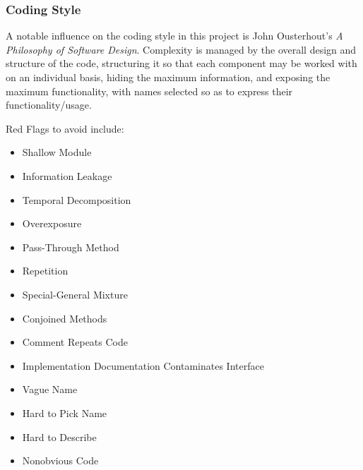 \documentclass{ltxdoc}
\begin{document}
\subsubsection*{Coding Style}

A notable influence on the coding style in this project is John Ousterhout's \emph{A Philosophy of Software Design}\cite{Ousterhout2018APO}. Complexity is managed by the overall design and structure of the code, structuring it so that each component may be worked with on an individual basis, hiding the maximum information, and exposing the maximum functionality, with names selected so as to express their functionality/usage.

Red Flags to avoid include:

\begin{itemize}
\item Shallow Module
\item Information Leakage
\item Temporal Decomposition 
\item Overexposure
\item Pass-Through Method
\item Repetition
\item Special-General Mixture
\item Conjoined Methods
\item Comment Repeats Code
\item Implementation Documentation Contaminates Interface
\item Vague Name
\item Hard to Pick Name
\item Hard to Describe
\item Nonobvious Code
\end{itemize}
\end{document}
